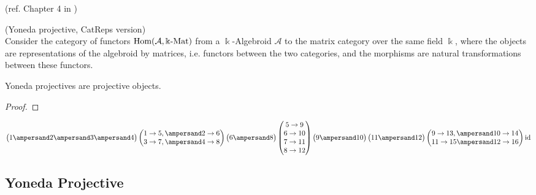 (ref. Chapter 4 in \cite{[CategoryAlgebras_Webb]})
\begin{definition}{(Yoneda projective, CatReps version)}\label{la:yoneda_projective}\\
Consider the category of functors $\textup{Hom}( \mathcal{A}, \Bbbk\textup{-Mat} )$ from a $\Bbbk$-Algebroid $\mathcal{A}$ to the matrix category
over the same field $\Bbbk$, where the objects are representations of the algebroid by matrices, i.e. functors between the two categories, and
the morphisms are natural transformations between these functors.
\end{definition}

\begin{lemma}
Yoneda projectives are projective objects.
\begin{proof}
\end{proof}
\end{lemma}

\[
\begin{pmatrix}1 \ampersand 2 \ampersand 3 \ampersand 4\end{pmatrix}
\begin{pmatrix} 1\to5, \ampersand 2\to6 \\ 3\to7, \ampersand 4\to8 \end{pmatrix}
\begin{pmatrix}6 \ampersand 8\end{pmatrix}
\begin{pmatrix}5\to9\\6\to10\\7\to11\\8\to12\end{pmatrix}
\begin{pmatrix}9\ampersand10\end{pmatrix}\begin{pmatrix}11\ampersand12\end{pmatrix}
\begin{pmatrix}9\to13, \ampersand 10\to14\\11\to15 \ampersand 12\to16\end{pmatrix}
\textup{id}
\]

\subsection{Yoneda Projective}

